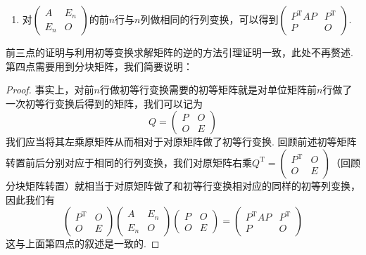 \begin{enumerate}
\begin{enumerate}
              \item 对$\begin{pmatrix}
                            A & E_n \\ E_n & O
                        \end{pmatrix}$的前$n$行与$n$列做相同的行列变换，可以得到$\begin{pmatrix}
                            P^\mathrm{T}AP & P^\mathrm{T} \\ P & O
                        \end{pmatrix}$.
          \end{enumerate}
          前三点的证明与利用初等变换求解矩阵的逆的方法引理证明一致，此处不再赘述. 第四点需要用到分块矩阵，我们简要说明：

          \begin{proof}
              事实上，对前$n$行做初等行变换需要的初等矩阵就是对单位矩阵前$n$行做了一次初等行变换后得到的矩阵，我们可以记为
              \[Q=\begin{pmatrix}
                      P & O \\ O & E
                  \end{pmatrix}\]
              我们应当将其左乘原矩阵从而相对于对原矩阵做了初等行变换. 回顾前述初等矩阵转置前后分别对应于相同的行列变换，我们对原矩阵右乘$Q^{\mathrm{T}}=\begin{pmatrix}
                      P^\mathrm{T} & O \\ O & E
                  \end{pmatrix}$（回顾分块矩阵转置）就相当于对原矩阵做了和初等行变换相对应的同样的初等列变换，因此我们有
              \[\begin{pmatrix}
                      P^\mathrm{T} & O \\ O & E
                  \end{pmatrix}\begin{pmatrix}
                      A & E_n \\ E_n & O
                  \end{pmatrix}\begin{pmatrix}
                      P & O \\ O & E
                  \end{pmatrix}=\begin{pmatrix}
                      P^\mathrm{T}AP & P^\mathrm{T} \\ P & O
                  \end{pmatrix}\]
              这与上面第四点的叙述是一致的.
          \end{proof}
\end{enumerate}


